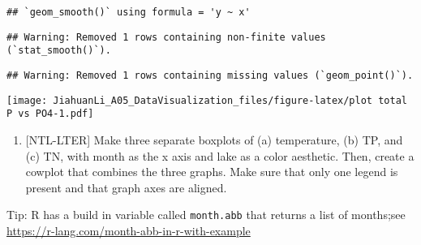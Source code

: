 \documentclass[
]{article}
\providecommand{\tightlist}{%
  \setlength{\itemsep}{0pt}\setlength{\parskip}{0pt}}
\begin{document}
\begin{verbatim}
## `geom_smooth()` using formula = 'y ~ x'
\end{verbatim}

\begin{verbatim}
## Warning: Removed 1 rows containing non-finite values (`stat_smooth()`).
\end{verbatim}

\begin{verbatim}
## Warning: Removed 1 rows containing missing values (`geom_point()`).
\end{verbatim}

\texttt{[image: JiahuanLi\_A05\_DataVisualization\_files/figure-latex/plot total P vs PO4-1.pdf]}

\begin{enumerate}
\def\labelenumi{\arabic{enumi}.}
\setcounter{enumi}{4}
\tightlist
\item
  {[}NTL-LTER{]} Make three separate boxplots of (a) temperature, (b)
  TP, and (c) TN, with month as the x axis and lake as a color
  aesthetic. Then, create a cowplot that combines the three graphs. Make
  sure that only one legend is present and that graph axes are aligned.
\end{enumerate}

Tip: R has a build in variable called \texttt{month.abb} that returns a
list of months;see \url{https://r-lang.com/month-abb-in-r-with-example}
\end{document}
